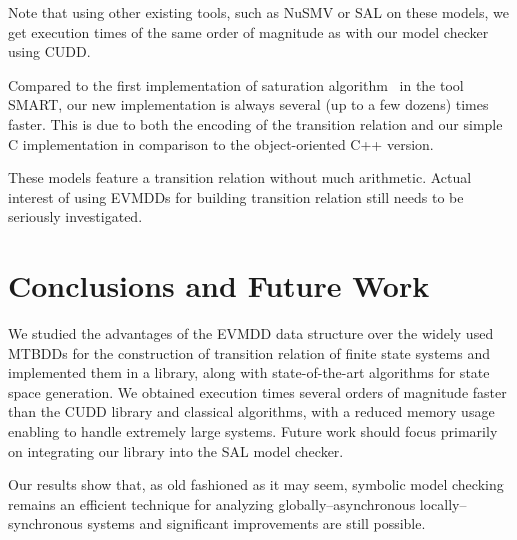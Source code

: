 \documentclass[a4paper,oneside,11pt,pdftex]{llncs}
\newcommand{\IGNORE}[1]{}
\begin{document}
Note that using other existing tools, such as NuSMV or SAL on these models, we get execution times of the same order of magnitude as with our model checker using CUDD.

Compared to the first implementation of saturation algorithm~\cite{Saturation2001} in the tool SMART, our new implementation is always several (up to a few dozens) times faster.
This is due to both the encoding of the transition relation
and our simple C implementation in comparison to the object-oriented C++ version.

These models feature a transition relation without much arithmetic.
Actual interest of using EVMDDs for building transition relation
still needs to be seriously investigated.

\section{Conclusions and Future Work}

We studied the advantages of the EVMDD data structure
over the widely used MTBDDs for the construction
of transition relation of finite state systems
and implemented them in a library, along with
state-of-the-art algorithms for state space generation.
We obtained execution times several orders of magnitude faster
than the CUDD library and classical algorithms,
with a reduced memory usage enabling to handle extremely large systems.
Future work should focus primarily on integrating our library
into the SAL model checker.

Our results show that, as old fashioned as it may seem,
symbolic model checking remains an efficient technique
for analyzing globally--asynchronous locally--synchronous systems and
significant improvements are still possible.

\IGNORE{
\section{About the Internship}

This internship was an excellent opportunity to discover
symbolic model checking, since I used to know almost nothing
about model checking before it.

I would like to thank Radu Siminiceanu a lot for being
more than an attentive internship director.
Thanks also to Gilles Dowek for his appreciated welcoming
at the beginning of the internship, when I was still suffering
the effects of jet lag. I won't forget some of the people
doing research in room 105 at NIA: Alwyn Goodloe,
Paolo Gradassi, Heber Herencia Zapana, Mark van der Steen,
Taylor Spalt and David Billingsley who make me discovering
the environment of Hampton, Washington and both sites
of the unique National Air and Space Museum.
Thanks again to César Mu\~{n}oz and the Langley Formal Methods
team from NASA Langley Research Center for sharing many lunches
with us, to Daniel Hirschkoff and Jean-Christophe Filliâtre
for sending me there and finally to NIA administrative staff
for his happy efficiency.
}


\end{document}
